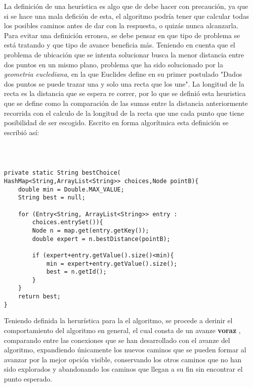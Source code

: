\documentclass[journal]{IEEEtran}
\begin{document}
La definición de una heurística es algo que de debe hacer con precaución, ya que si se hace una mala defición de esta, el algoritmo podría tener que calcular todas los posibles caminos antes de dar con la respuesta, o quizás nunca alcanzarla. Para evitar una definición erronea, se debe pensar en que tipo de problema se está tratando y que tipo de avance beneficia más. Teniendo en cuenta que el problema de ubicación que se intenta solucionar busca la menor distancia entre dos puntos en un mismo plano, problema que ha sido solucionado por la \emph{geometria euclediana}, en la que Euclides define en su primer postulado "Dados dos puntos se puede trazar una y solo una recta que los une". La longitud de la recta es la distancia que se espera re correr, por lo que se definió esta heuristica que se define como la comparación de las sumas entre la distancia anteriormente recorrida con el calculo de la longitud de la recta que une cada punto que tiene posibilidad de ser escogido. Escrito en forma algorítmica esta definición se escribió así:

\lstset{language=Java, tabsize=1, showstringspaces=false}
\begin{scriptsize}\ttfamily\begin{lstlisting}



private static String bestChoice(
HashMap<String,ArrayList<String>> choices,Node pointB){
	double min = Double.MAX_VALUE;
	String best = null;
		
	for (Entry<String, ArrayList<String>> entry : 
		choices.entrySet()){
		Node n = map.get(entry.getKey());
		double expert = n.bestDistance(pointB);
			
		if (expert+entry.getValue().size()<min){
			min = expert+entry.getValue().size();
			best = n.getId();
		}
	}
	return best;
}
\end{lstlisting}\end{scriptsize}

Teniendo definida la herurística para la el algoritmo, se procede a derinir el comportamiento del algoritmo en general, el cual consta de un avanze \textbf{voraz} , comparando entre las conexiones que se han desarrollado con el avanze del algoritmo, expandiendo únicamente los nuevos caminos que se pueden formar al avanzar por la mejor opción visible, conservando los otros caminos que no han sido explorados y abandonando los caminos que llegan a su fin sin encontrar el punto esperado.
\end{document}
